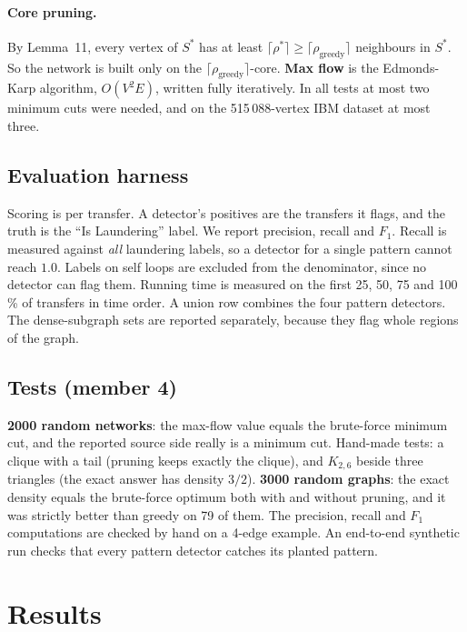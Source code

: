 \documentclass[11pt,a4paper]{article}
\theoremstyle{definition}
\begin{document}
\paragraph{Core pruning.} By Lemma~11, every vertex of $S^*$ has at least $\lceil \rho^* \rceil \ge \lceil \rho_{\text{greedy}} \rceil$ neighbours in $S^*$. So the network is built only on the $\lceil \rho_{\text{greedy}} \rceil$-core. \textbf{Max flow} is the Edmonds-Karp algorithm, $O(V^2 E)$, written fully iteratively. In all tests at most two minimum cuts were needed, and on the 515\,088-vertex IBM dataset at most three.

\subsection{Evaluation harness}
Scoring is per transfer. A detector's positives are the transfers it flags, and the truth is the ``Is Laundering'' label. We report precision, recall and $F_1$. Recall is measured against \emph{all} laundering labels, so a detector for a single pattern cannot reach $1.0$. Labels on self loops are excluded from the denominator, since no detector can flag them. Running time is measured on the first 25, 50, 75 and 100\,\% of transfers in time order. A union row combines the four pattern detectors. The dense-subgraph sets are reported separately, because they flag whole regions of the graph.

\subsection{Tests (member 4)}
\textbf{2000 random networks}: the max-flow value equals the brute-force minimum cut, and the reported source side really is a minimum cut. Hand-made tests: a clique with a tail (pruning keeps exactly the clique), and $K_{2,6}$ beside three triangles (the exact answer has density $3/2$). \textbf{3000 random graphs}: the exact density equals the brute-force optimum both with and without pruning, and it was strictly better than greedy on 79 of them. The precision, recall and $F_1$ computations are checked by hand on a 4-edge example. An end-to-end synthetic run checks that every pattern detector catches its planted pattern.

\newpage
\section{Results}
\end{document}
